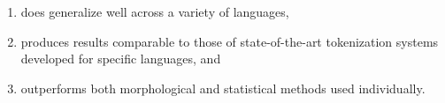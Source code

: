 \begin{enumerate}
\item does generalize well across a variety of languages,
\item produces results comparable to those of state-of-the-art
tokenization systems developed for specific languages, and
\item outperforms both morphological and statistical methods used individually.
\end{enumerate}